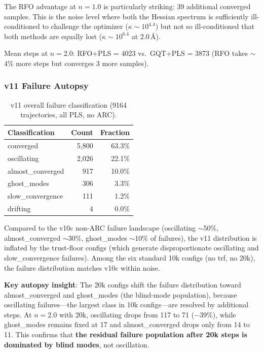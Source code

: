 \documentclass[11pt,a4paper]{article}
\theoremstyle{definition}
\begin{document}
The RFO advantage at $n=1.0$ is particularly striking: 39 additional
converged samples.  This is the noise level where both the Hessian
spectrum is sufficiently ill-conditioned to challenge the optimizer
($\kappa \sim 10^{4.4}$) but not so ill-conditioned that both methods
are equally lost ($\kappa \sim 10^{6.4}$ at 2.0\,\AA).

Mean steps at $n=2.0$: RFO+PLS = 4023 vs.\ GQT+PLS = 3873 (RFO takes
$\sim$4\% more steps but converges 3 more samples).

\subsubsection{v11 Failure Autopsy}
\label{sec:v11-autopsy}

\begin{table}[h]
\centering
\caption{v11 overall failure classification (9164 trajectories, all PLS, no ARC).}
\label{tab:v11-autopsy}
\begin{tabular}{lrr}
\toprule
Classification & Count & Fraction \\
\midrule
converged          & 5,800 & 63.3\% \\
oscillating        & 2,026 & 22.1\% \\
almost\_converged   &   917 & 10.0\% \\
ghost\_modes        &   306 &  3.3\% \\
slow\_convergence   &   111 &  1.2\% \\
drifting           &     4 &  0.0\% \\
\bottomrule
\end{tabular}
\end{table}

Compared to the v10c non-ARC failure landscape (oscillating $\sim$50\%,
almost\_converged $\sim$30\%, ghost\_modes $\sim$10\% of failures), the v11
distribution is inflated by the trust-floor configs (which generate
disproportionate oscillating and slow\_convergence failures).  Among the
six standard 10k configs (no trf, no 20k), the failure distribution
matches v10c within noise.

\textbf{Key autopsy insight}: The 20k configs shift the failure
distribution toward almost\_converged and ghost\_modes (the blind-mode
population), because oscillating failures---the largest class in 10k
configs---are resolved by additional steps.  At $n=2.0$ with 20k,
oscillating drops from 117 to 71 ($-$39\%), while ghost\_modes remains
fixed at 17 and almost\_converged drops only from 14 to 11.  This confirms
that \textbf{the residual failure population after 20k steps is dominated
by blind modes}, not oscillation.
\end{document}
